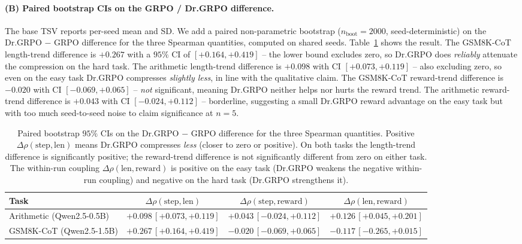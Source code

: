 \paragraph{(B) Paired bootstrap CIs on the GRPO / Dr.GRPO difference.}
The base TSV reports per-seed mean and SD. We add a paired
non-parametric bootstrap ($n_\text{boot}=2000$, seed-deterministic)
on the Dr.GRPO $-$ GRPO difference for the three Spearman
quantities, computed on shared seeds. Table~\ref{tab:length-bias-ci}
shows the result. The GSM8K-CoT length-trend difference is
$+0.267$ with a $95\%$ CI of $[+0.164, +0.419]$ -- the lower
bound excludes zero, so Dr.GRPO does \emph{reliably} attenuate
the compression on the hard task. The arithmetic length-trend
difference is $+0.098$ with CI $[+0.073, +0.119]$ -- also
excluding zero, so even on the easy task Dr.GRPO compresses
\emph{slightly less}, in line with the qualitative claim. The
GSM8K-CoT reward-trend difference is $-0.020$ with CI
$[-0.069, +0.065]$ -- \emph{not} significant, meaning Dr.GRPO
neither helps nor hurts the reward trend. The arithmetic
reward-trend difference is $+0.043$ with CI $[-0.024, +0.112]$ --
borderline, suggesting a small Dr.GRPO reward advantage on the
easy task but with too much seed-to-seed noise to claim
significance at $n{=}5$.

\begin{table}[htbp]
\centering
\small
\begin{tabular}{lccc}
\toprule
Task & $\Delta\rho(\text{step},\text{len})$
   & $\Delta\rho(\text{step},\text{reward})$
   & $\Delta\rho(\text{len},\text{reward})$ \\
\midrule
Arithmetic (Qwen2.5-0.5B)   & $+0.098\,[+0.073,+0.119]$ & $+0.043\,[-0.024,+0.112]$ & $+0.126\,[+0.045,+0.201]$ \\
GSM8K-CoT (Qwen2.5-1.5B)    & $+0.267\,[+0.164,+0.419]$ & $-0.020\,[-0.069,+0.065]$ & $-0.117\,[-0.265,+0.015]$ \\
\bottomrule
\end{tabular}
\caption{Paired bootstrap $95\%$ CIs on the Dr.GRPO $-$ GRPO
difference for the three Spearman quantities. Positive
$\Delta\rho(\text{step},\text{len})$ means Dr.GRPO compresses
\emph{less} (closer to zero or positive). On both tasks the
length-trend difference is significantly positive; the
reward-trend difference is not significantly different from zero
on either task. The within-run coupling
$\Delta\rho(\text{len},\text{reward})$ is positive on the easy
task (Dr.GRPO weakens the negative within-run coupling) and
negative on the hard task (Dr.GRPO strengthens it).}
\label{tab:length-bias-ci}
\end{table}

